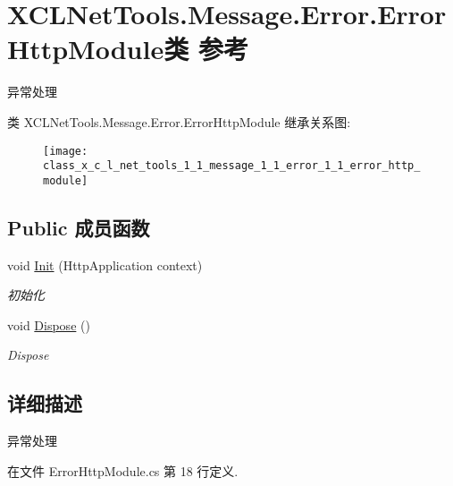 \hypertarget{class_x_c_l_net_tools_1_1_message_1_1_error_1_1_error_http_module}{\section{X\-C\-L\-Net\-Tools.\-Message.\-Error.\-Error\-Http\-Module类 参考}
\label{class_x_c_l_net_tools_1_1_message_1_1_error_1_1_error_http_module}
}


异常处理  


类 X\-C\-L\-Net\-Tools.\-Message.\-Error.\-Error\-Http\-Module 继承关系图\-:\begin{figure}[H]
\begin{center}
\leavevmode
\texttt{[image: class\_x\_c\_l\_net\_tools\_1\_1\_message\_1\_1\_error\_1\_1\_error\_http\_module]}
\end{center}
\end{figure}
\subsection*{Public 成员函数}
\begin{DoxyCompactItemize}
\item 
void \hyperlink{class_x_c_l_net_tools_1_1_message_1_1_error_1_1_error_http_module_aa4e06d53382795826ed453b62afa265d}{Init} (Http\-Application context)
\begin{DoxyCompactList}\small\item\em 初始化 \end{DoxyCompactList}\item 
void \hyperlink{class_x_c_l_net_tools_1_1_message_1_1_error_1_1_error_http_module_a796d6d747b8620b5e260858e05abd09f}{Dispose} ()
\begin{DoxyCompactList}\small\item\em Dispose \end{DoxyCompactList}\end{DoxyCompactItemize}


\subsection{详细描述}
异常处理 



在文件 Error\-Http\-Module.\-cs 第 18 行定义.



